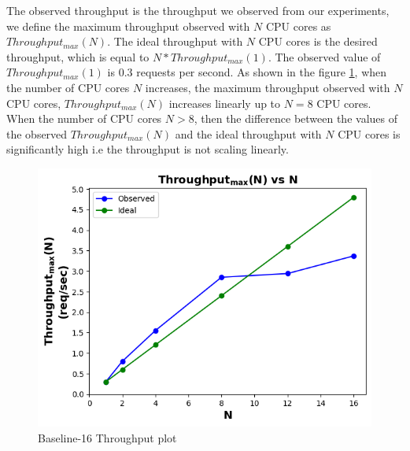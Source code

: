 \documentclass{iitbreport}
\begin{document}
The observed throughput is the throughput we observed from our experiments, we define the maximum throughput observed with $N$ CPU cores as $Throughput_{max}(N)$. The ideal throughput with $N$ CPU cores is the desired throughput, which is equal to $N*Throughput_{max}(1)$. The observed value of $Throughput_{max}(1)$ is 0.3 requests per second. As shown in the figure \ref{baseline_throughput_plot}, when the number of CPU cores $N$ increases, the maximum throughput observed with $N$ CPU cores, $Throughput_{max}(N)$ increases linearly up to $N=8$ CPU cores. When the number of CPU cores $N>8$, then the difference between the values of the observed  $Throughput_{max}(N)$  and the ideal throughput with $N$ CPU cores is significantly high i.e the throughput is not scaling linearly.


\begin{figure}[!htb]
  \centering
  \includegraphics[width=\linewidth]{Images/Baseline-16_throughput.png}
  \caption{Baseline-16 Throughput plot}
  \label{baseline_throughput_plot}
\end{figure}
\end{document}
